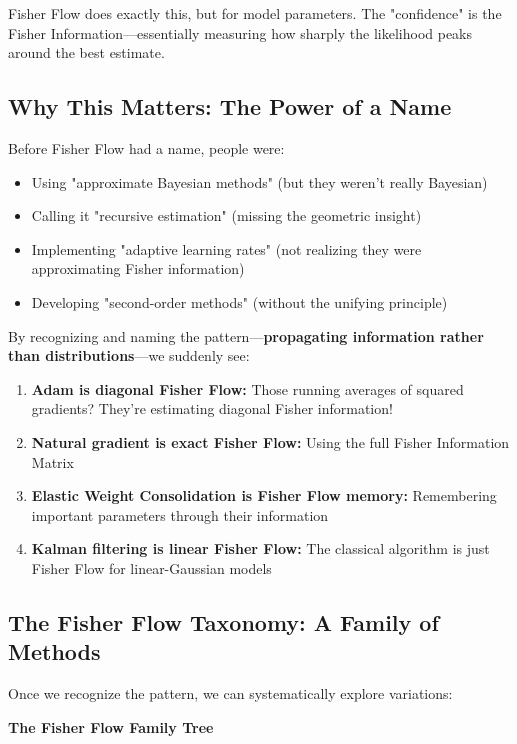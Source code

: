 \documentclass[11pt]{article}
\begin{document}
Fisher Flow does exactly this, but for model parameters. The "confidence" is the Fisher Information—essentially measuring how sharply the likelihood peaks around the best estimate.

\subsection{Why This Matters: The Power of a Name}

Before Fisher Flow had a name, people were:
\begin{itemize}
\item Using "approximate Bayesian methods" (but they weren't really Bayesian)
\item Calling it "recursive estimation" (missing the geometric insight)
\item Implementing "adaptive learning rates" (not realizing they were approximating Fisher information)
\item Developing "second-order methods" (without the unifying principle)
\end{itemize}

By recognizing and naming the pattern—\textbf{propagating information rather than distributions}—we suddenly see:

\begin{enumerate}
\item \textbf{Adam is diagonal Fisher Flow:} Those running averages of squared gradients? They're estimating diagonal Fisher information!
\item \textbf{Natural gradient is exact Fisher Flow:} Using the full Fisher Information Matrix
\item \textbf{Elastic Weight Consolidation is Fisher Flow memory:} Remembering important parameters through their information
\item \textbf{Kalman filtering is linear Fisher Flow:} The classical algorithm is just Fisher Flow for linear-Gaussian models
\end{enumerate}

\subsection{The Fisher Flow Taxonomy: A Family of Methods}

Once we recognize the pattern, we can systematically explore variations:

\begin{center}
\textbf{The Fisher Flow Family Tree}
\end{center}
\end{document}
